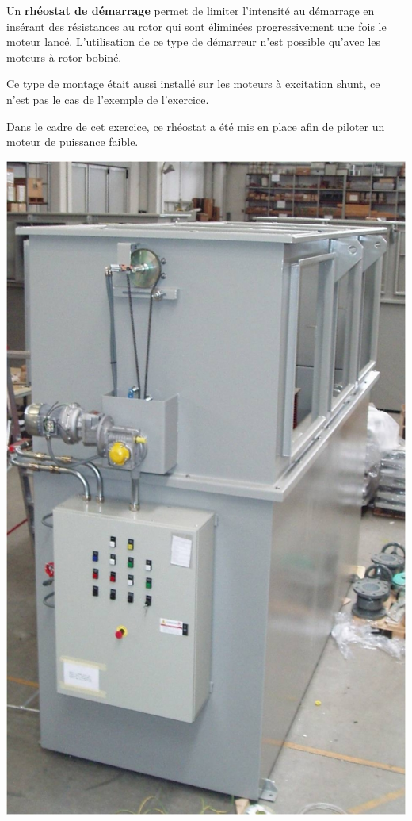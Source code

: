 \begin{minipage}{0.65\linewidth}
Un \textbf{rhéostat de démarrage} permet de limiter l'intensité au démarrage en insérant des résistances au rotor qui sont éliminées progressivement une fois le moteur lancé. L'utilisation de ce type de démarreur n'est possible qu'avec les moteurs à rotor bobiné.

Ce type de montage était aussi installé sur les moteurs à excitation shunt, ce n'est pas le cas de l'exemple de l'exercice.

Dans le cadre de cet exercice, ce rhéostat a été mis en place afin de piloter un moteur de puissance faible.
\end{minipage}
 \hfill
\begin{minipage}{0.3\linewidth}
 \centering\includegraphics[width=0.5\linewidth]{img/rheostat}
\end{minipage}

\vspace{1cm}

